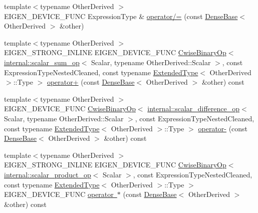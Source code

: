 \begin{DoxyCompactItemize}
\item 
{\footnotesize template$<$typename Other\+Derived $>$ }\\E\+I\+G\+E\+N\+\_\+\+D\+E\+V\+I\+C\+E\+\_\+\+F\+U\+NC Expression\+Type \& \mbox{\hyperlink{class_eigen_1_1_vectorwise_op_ac04267f84ef1c52d88f452667cf757ae}{operator/=}} (const \mbox{\hyperlink{class_eigen_1_1_dense_base}{Dense\+Base}}$<$ Other\+Derived $>$ \&other)
\item 
{\footnotesize template$<$typename Other\+Derived $>$ }\\E\+I\+G\+E\+N\+\_\+\+S\+T\+R\+O\+N\+G\+\_\+\+I\+N\+L\+I\+NE E\+I\+G\+E\+N\+\_\+\+D\+E\+V\+I\+C\+E\+\_\+\+F\+U\+NC \mbox{\hyperlink{class_eigen_1_1_cwise_binary_op}{Cwise\+Binary\+Op}}$<$ \mbox{\hyperlink{struct_eigen_1_1internal_1_1scalar__sum__op}{internal\+::scalar\+\_\+sum\+\_\+op}}$<$ Scalar, typename Other\+Derived\+::\+Scalar $>$, const Expression\+Type\+Nested\+Cleaned, const typename \mbox{\hyperlink{struct_eigen_1_1_vectorwise_op_1_1_extended_type}{Extended\+Type}}$<$ Other\+Derived $>$\+::Type $>$ \mbox{\hyperlink{class_eigen_1_1_vectorwise_op_ad38bb674b896bfc8f96baeb487aa2184}{operator+}} (const \mbox{\hyperlink{class_eigen_1_1_dense_base}{Dense\+Base}}$<$ Other\+Derived $>$ \&other) const
\item 
{\footnotesize template$<$typename Other\+Derived $>$ }\\E\+I\+G\+E\+N\+\_\+\+D\+E\+V\+I\+C\+E\+\_\+\+F\+U\+NC \mbox{\hyperlink{class_eigen_1_1_cwise_binary_op}{Cwise\+Binary\+Op}}$<$ \mbox{\hyperlink{struct_eigen_1_1internal_1_1scalar__difference__op}{internal\+::scalar\+\_\+difference\+\_\+op}}$<$ Scalar, typename Other\+Derived\+::\+Scalar $>$, const Expression\+Type\+Nested\+Cleaned, const typename \mbox{\hyperlink{struct_eigen_1_1_vectorwise_op_1_1_extended_type}{Extended\+Type}}$<$ Other\+Derived $>$\+::Type $>$ \mbox{\hyperlink{class_eigen_1_1_vectorwise_op_a5aced68defd8d0fd08829386b6c285fb}{operator-\/}} (const \mbox{\hyperlink{class_eigen_1_1_dense_base}{Dense\+Base}}$<$ Other\+Derived $>$ \&other) const
\item 
{\footnotesize template$<$typename Other\+Derived $>$ }\\E\+I\+G\+E\+N\+\_\+\+S\+T\+R\+O\+N\+G\+\_\+\+I\+N\+L\+I\+NE E\+I\+G\+E\+N\+\_\+\+D\+E\+V\+I\+C\+E\+\_\+\+F\+U\+NC \mbox{\hyperlink{class_eigen_1_1_cwise_binary_op}{Cwise\+Binary\+Op}}$<$ \mbox{\hyperlink{struct_eigen_1_1internal_1_1scalar__product__op}{internal\+::scalar\+\_\+product\+\_\+op}}$<$ Scalar $>$, const Expression\+Type\+Nested\+Cleaned, const typename \mbox{\hyperlink{struct_eigen_1_1_vectorwise_op_1_1_extended_type}{Extended\+Type}}$<$ Other\+Derived $>$\+::Type $>$ E\+I\+G\+E\+N\+\_\+\+D\+E\+V\+I\+C\+E\+\_\+\+F\+U\+NC \mbox{\hyperlink{class_eigen_1_1_vectorwise_op_ae5190ecc9dad889b78a91720ea76d8d7}{operator $\ast$}} (const \mbox{\hyperlink{class_eigen_1_1_dense_base}{Dense\+Base}}$<$ Other\+Derived $>$ \&other) const

\end{DoxyCompactItemize}
